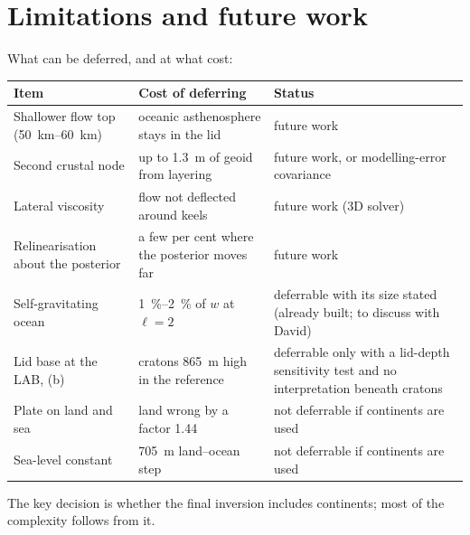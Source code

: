 \section{Limitations and future work}
What can be deferred, and at what cost:
\begin{center}
\small
\begin{longtable}{p{}p{}p{}}
\toprule
Item & Cost of deferring & Status\\
\midrule
\endhead
Shallower flow top (\qtyrange{50}{60}{km}) & oceanic asthenosphere stays in the lid & future work\\
Second crustal node & up to \qty{1.3}{m} of geoid from layering & future work, or modelling-error covariance\\
Lateral viscosity & flow not deflected around keels & future work (3D solver)\\
Relinearisation about the posterior & a few per cent where the posterior moves far & future work\\
Self-gravitating ocean & \qtyrange{1}{2}{\percent} of $w$ at $\ell=2$ & deferrable with its size stated (already built; to discuss with David)\\
Lid base at the LAB, (b) & cratons \qty{+865}{m} high in the reference & deferrable only with a lid-depth sensitivity test and no interpretation beneath cratons\\
Plate on land and sea & land wrong by a factor 1.44 & not deferrable if continents are used\\
Sea-level constant & \qty{705}{m} land--ocean step & not deferrable if continents are used\\
\bottomrule
\end{longtable}
\end{center}
The key decision is whether the final inversion includes continents; most of the complexity follows from it.
